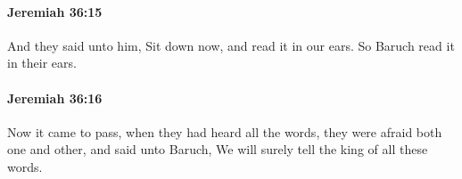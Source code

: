 		\paragraph{Jeremiah 36:15} %
			\label{JEREMIAH-36-15}

			And they said unto him, Sit down now, and read it in our ears. So Baruch read it in their ears.


		\paragraph{Jeremiah 36:16} %
			\label{JEREMIAH-36-16}

			Now it came to pass, when they had heard all the words, they were afraid both one and other, and said unto Baruch, We will surely tell the king of all these words.


